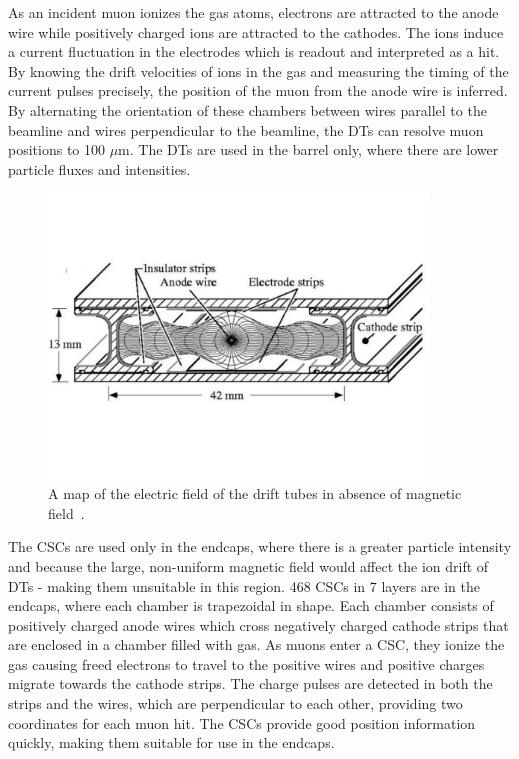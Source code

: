 As an incident muon ionizes the gas atoms, electrons are attracted to the anode wire while positively charged ions are attracted to the cathodes. 
The ions induce a current fluctuation in the electrodes which is readout and interpreted as a hit. By knowing the drift velocities of ions in the gas and measuring
the timing of the current pulses precisely, the position of the muon from the anode wire is inferred. By alternating the orientation of these chambers between wires parallel to the beamline
and wires perpendicular to the beamline, the DTs can resolve muon positions to 100 $\mu$m. 
The DTs are used in the barrel only, where there are lower particle fluxes and intensities. 

\begin{figure}[hbtp]
 \begin{center}
   \includegraphics[width=0.9\textwidth]{ch3_figs/cms_dt.pdf}
   \caption[Drift tube chamber and internal E field]{A map of the electric field of the drift tubes in absence of magnetic field~\cite{cms_bluebook}.}
   \label{fig:cms_dt}
 \end{center}
\end{figure}

The CSCs are used only in the endcaps, where there is a greater particle intensity and because the large, non-uniform magnetic field would affect the ion drift of DTs - making them unsuitable in this region.
468 CSCs in 7 layers are in the endcaps, where each chamber is trapezoidal in shape.
Each chamber consists of positively charged anode wires which cross negatively charged cathode strips that are enclosed in a chamber filled with gas. As muons enter a
CSC, they ionize the gas causing freed electrons to travel to the positive wires and positive charges migrate towards the cathode strips. The charge pulses are detected in both the strips
and the wires, which are perpendicular to each other, providing two coordinates for each muon hit. The CSCs provide good position information quickly, making them suitable for use in the endcaps. 

